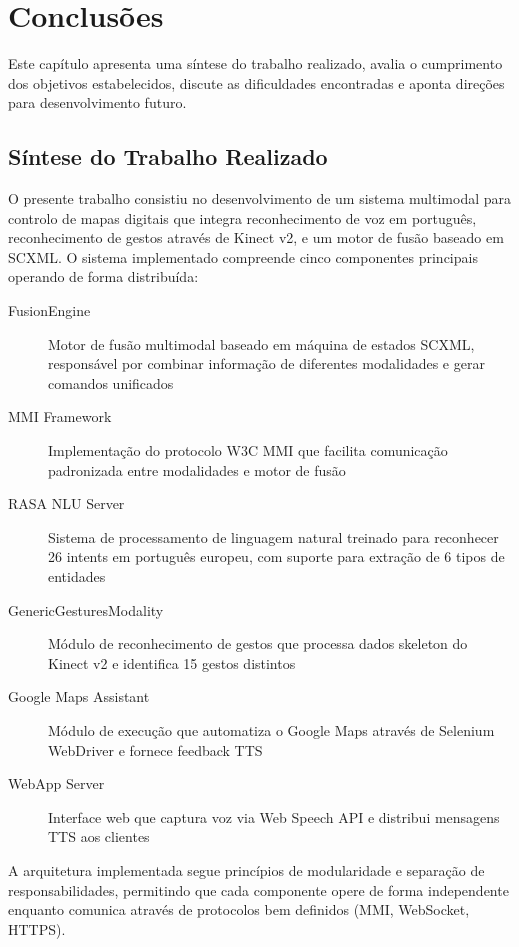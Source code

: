 \documentclass{report}
\begin{document}
\chapter{Conclusões}

Este capítulo apresenta uma síntese do trabalho realizado, avalia o cumprimento dos objetivos estabelecidos, discute as dificuldades encontradas e aponta direções para desenvolvimento futuro.

\section{Síntese do Trabalho Realizado}

O presente trabalho consistiu no desenvolvimento de um sistema multimodal para controlo de mapas digitais que integra reconhecimento de voz em português, reconhecimento de gestos através de Kinect v2, e um motor de fusão baseado em SCXML. O sistema implementado compreende cinco componentes principais operando de forma distribuída:

\begin{description}
    \item[FusionEngine] Motor de fusão multimodal baseado em máquina de estados SCXML, responsável por combinar informação de diferentes modalidades e gerar comandos unificados

    \item[MMI Framework] Implementação do protocolo W3C MMI que facilita comunicação padronizada entre modalidades e motor de fusão

    \item[RASA NLU Server] Sistema de processamento de linguagem natural treinado para reconhecer 26 intents em português europeu, com suporte para extração de 6 tipos de entidades

    \item[GenericGesturesModality] Módulo de reconhecimento de gestos que processa dados skeleton do Kinect v2 e identifica 15 gestos distintos

    \item[Google Maps Assistant] Módulo de execução que automatiza o Google Maps através de Selenium WebDriver e fornece feedback TTS

    \item[WebApp Server] Interface web que captura voz via Web Speech API e distribui mensagens TTS aos clientes
\end{description}

A arquitetura implementada segue princípios de modularidade e separação de responsabilidades, permitindo que cada componente opere de forma independente enquanto comunica através de protocolos bem definidos (MMI, WebSocket, HTTPS).
\end{document}
